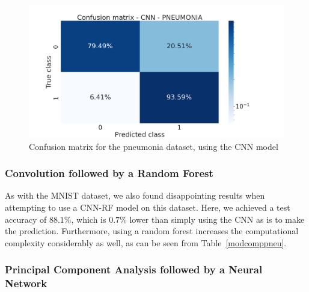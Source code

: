 \documentclass[onecolumn,10pt,cleanfoot]{asme2ej}
\begin{document}
\begin{figure}[H]
\centerline{\includegraphics[width=5in]{figure/conf_cnn_pneu.png}}
\caption{Confusion matrix for the pneumonia dataset, using the CNN model}
\label{conf_cnn_pneu}
\end{figure}

\subsubsection{Convolution followed by a Random Forest}

As with the MNIST dataset, we also found disappointing results when attempting to use a CNN-RF model on this dataset. Here, we achieved a test accuracy of $88.1\%$, which is $0.7\%$ lower than simply using the CNN as is to make the prediction. Furthermore, using a random forest increases the computational complexity considerably as well, as can be seen from Table~\ref{modcomppneu}.

\subsubsection{Principal Component Analysis followed by a Neural Network}
\end{document}
